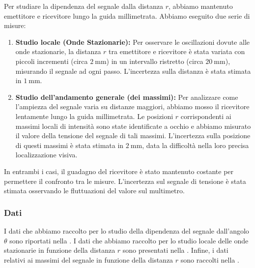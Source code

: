\documentclass[a4paper]{article}
\begin{document}
Per studiare la dipendenza del segnale dalla distanza $r$, abbiamo mantenuto emettitore e ricevitore lungo la guida millimetrata. Abbiamo eseguito due serie di misure:
\begin{enumerate}
    \item \textbf{Studio locale (Onde Stazionarie):} Per osservare le oscillazioni dovute alle onde stazionarie, la distanza $r$ tra emettitore e ricevitore è stata variata con piccoli incrementi (circa $\SI{2}{\milli\metre}$) in un intervallo ristretto (circa $\SI{20}{\milli\metre}$), misurando il segnale ad ogni passo. L'incertezza sulla distanza è stata stimata in $\SI{1}{\milli\metre}$.
    \item \textbf{Studio dell'andamento generale (dei massimi):} Per analizzare come l'ampiezza del segnale varia su distanze maggiori, abbiamo mosso il ricevitore lentamente lungo la guida millimetrata. Le posizioni $r$ corrispondenti ai massimi locali di intensità sono state identificate a occhio e abbiamo misurato il valore della tensione del segnale di tali massimi. L'incertezza sulla posizione di questi massimi è stata stimata in $\SI{2}{\milli\metre}$, data la difficoltà nella loro precisa localizzazione visiva.
\end{enumerate}
In entrambi i casi, il guadagno del ricevitore è stato mantenuto costante per permettere il confronto tra le misure. L'incertezza sul segnale di tensione è stata stimata osservando le fluttuazioni del valore sul multimetro.

\subsubsection{Dati}
I dati che abbiamo raccolto per lo studio della dipendenza del segnale dall'angolo $\theta$ sono riportati nella .
I dati che abbiamo raccolto per lo studio locale delle onde stazionarie in funzione della distanza $r$ sono presentati nella .
Infine, i dati relativi ai massimi del segnale in funzione della distanza $r$ sono raccolti nella .
\end{document}
